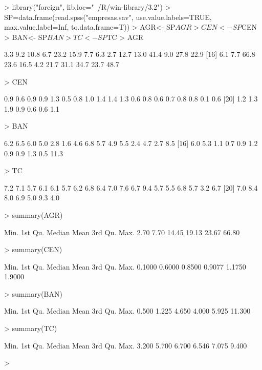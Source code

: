 \documentclass{article}
\begin{document}
\begin{Schunk}
\begin{Sinput}
> library("foreign", lib.loc="~/R/win-library/3.2")
> SP=data.frame(read.spss("empresas.sav", use.value.labels=TRUE, max.value.label=Inf, to.data.frame=T))
> AGR<- SP$AGR
> CEN<- SP$CEN
> BAN<- SP$BAN
> TC<-  SP$TC
> AGR
\end{Sinput}
\begin{Soutput}
 [1]  3.3  9.2 10.8  6.7 23.2 15.9  7.7  6.3  2.7 12.7 13.0 41.4  9.0 27.8 22.9
[16]  6.1  7.7 66.8 23.6 16.5  4.2 21.7 31.1 34.7 23.7 48.7
\end{Soutput}
\begin{Sinput}
> CEN
\end{Sinput}
\begin{Soutput}
 [1] 0.9 0.6 0.9 0.9 1.3 0.5 0.8 1.0 1.4 1.4 1.3 0.6 0.8 0.6 0.7 0.8 0.8 0.1 0.6
[20] 1.2 1.3 1.9 0.9 0.6 0.6 1.1
\end{Soutput}
\begin{Sinput}
> BAN
\end{Sinput}
\begin{Soutput}
 [1]  6.2  6.5  6.0  5.0  2.8  1.6  4.6  6.8  5.7  4.9  5.5  2.4  4.7  2.7  8.5
[16]  6.0  5.3  1.1  0.7  0.9  1.2  0.9  0.9  1.3  0.5 11.3
\end{Soutput}
\begin{Sinput}
> TC
\end{Sinput}
\begin{Soutput}
 [1] 7.2 7.1 5.7 6.1 6.1 5.7 6.2 6.8 6.4 7.0 7.6 6.7 9.4 5.7 5.5 6.8 5.7 3.2 6.7
[20] 7.0 8.4 8.0 6.9 5.0 9.3 4.0
\end{Soutput}
\begin{Sinput}
> summary(AGR)
\end{Sinput}
\begin{Soutput}
   Min. 1st Qu.  Median    Mean 3rd Qu.    Max. 
   2.70    7.70   14.45   19.13   23.67   66.80 
\end{Soutput}
\begin{Sinput}
> summary(CEN)
\end{Sinput}
\begin{Soutput}
   Min. 1st Qu.  Median    Mean 3rd Qu.    Max. 
 0.1000  0.6000  0.8500  0.9077  1.1750  1.9000 
\end{Soutput}
\begin{Sinput}
> summary(BAN)
\end{Sinput}
\begin{Soutput}
   Min. 1st Qu.  Median    Mean 3rd Qu.    Max. 
  0.500   1.225   4.650   4.000   5.925  11.300 
\end{Soutput}
\begin{Sinput}
> summary(TC)
\end{Sinput}
\begin{Soutput}
   Min. 1st Qu.  Median    Mean 3rd Qu.    Max. 
  3.200   5.700   6.700   6.546   7.075   9.400 
\end{Soutput}
\begin{Sinput}
> 
\end{Sinput}
\end{Schunk}
\end{document}
